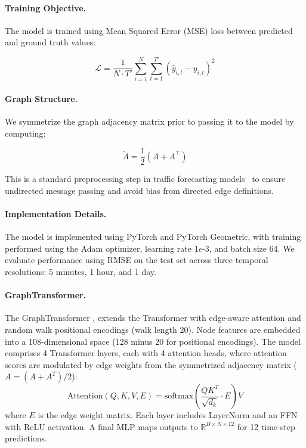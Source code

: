 \documentclass[runningheads]{llncs}
\begin{document}
\paragraph{Training Objective.} The model is trained using Mean Squared Error (MSE) loss between predicted and ground truth values:

\begin{equation}
\mathcal{L} = \frac{1}{N \cdot T'} \sum_{i=1}^{N} \sum_{t=1}^{T'} \left( \hat{y}_{i,t} - y_{i,t} \right)^2
\end{equation}

\paragraph{Graph Structure.} We symmetrize the graph adjacency matrix prior to passing it to the model by computing:

\[
\tilde{A} = \frac{1}{2}(A + A^\top)
\]

This is a standard preprocessing step in traffic forecasting models~\cite{li2018dcrnn} to ensure undirected message passing and avoid bias from directed edge definitions.

\paragraph{Implementation Details.} The model is implemented using PyTorch and PyTorch Geometric, with training performed using the Adam optimizer, learning rate $1e$-$3$, and batch size 64. We evaluate performance using RMSE on the test set across three temporal resolutions: 5 minutes, 1 hour, and 1 day.

\paragraph{GraphTransformer.}
The GraphTransformer \cite{dwivedi2021generalization}, extends the Transformer with edge-aware attention and random walk positional encodings (walk length 20). Node features are embedded into a 108-dimensional space (128 minus 20 for positional encodings). The model comprises 4 Transformer layers, each with 4 attention heads, where attention scores are modulated by edge weights from the symmetrized adjacency matrix (\( A = (A + A^T)/2 \)):
\[
\text{Attention}(Q, K, V, E) = \text{softmax}\left(\frac{QK^T}{\sqrt{d_k}} \cdot E\right)V
\]
where \( E \) is the edge weight matrix. Each layer includes LayerNorm and an FFN with ReLU activation. A final MLP maps outputs to \( \mathbb{R}^{B \times N \times 12} \) for 12 time-step predictions.
\end{document}
